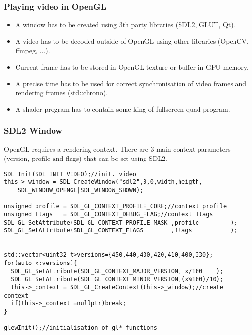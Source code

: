 
\begin{frame}[fragile]
  \frametitle{Playing video in OpenGL}
  \begin{itemize}
    \item A window has to be created using 3th party libraries (SDL2, GLUT, Qt).
    \item A video has to be decoded outside of OpenGL using other libraries (OpenCV, ffmpeg, ...).
    \item Current frame has to be stored in OpenGL texture or buffer in GPU memory.
    \item A precise time has to be used for correct synchronisation of video frames and rendering frames (std::chrono).
    \item A shader program has to contain some king of fullscreen quad program.
\end{itemize}
\end{frame}

\begin{frame}[fragile]
\frametitle{SDL2 Window}
  OpenGL requires a rendering context.
  There are 3 main context parameters (version, profile and flags) that can be set using SDL2.
  {\scriptsize
  \begin{verbatim}
SDL_Init(SDL_INIT_VIDEO);//init. video
this->_window = SDL_CreateWindow("sdl2",0,0,width,heigth,
    SDL_WINDOW_OPENGL|SDL_WINDOW_SHOWN);

unsigned profile = SDL_GL_CONTEXT_PROFILE_CORE;//context profile
unsigned flags   = SDL_GL_CONTEXT_DEBUG_FLAG;//context flags
SDL_GL_SetAttribute(SDL_GL_CONTEXT_PROFILE_MASK ,profile         );
SDL_GL_SetAttribute(SDL_GL_CONTEXT_FLAGS        ,flags           );


std::vector<uint32_t>versions={450,440,430,420,410,400,330};
for(auto x:versions){
  SDL_GL_SetAttribute(SDL_GL_CONTEXT_MAJOR_VERSION, x/100    );
  SDL_GL_SetAttribute(SDL_GL_CONTEXT_MINOR_VERSION,(x%100)/10);
  this->_context = SDL_GL_CreateContext(this->_window);//create context
  if(this->_context!=nullptr)break;
}

glewInit();//initialisation of gl* functions
  \end{verbatim}
  }
\end{frame}

